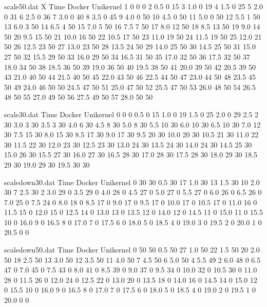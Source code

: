 \begin{filecontents}{scale50.dat}
    X   Time Docker Unikernel
    1   0   0   0
    2 0.5 0 15
    3 1.0 0 19
    4 1.5 0 25
    5 2.0 0 31
    6 2.5 0 36
    7 3.0 0 40
    8 3.5 0 45
    9 4.0 0 50
    10 4.5 0 50
    11 5.0 0 50
    12 5.5 1 50
    13 6.0 3 50
    14 6.5 4 50
    15 7.0 5 50
    16 7.5 7 50
    17 8.0 12 50
    18 8.5 13 50
    19 9.0 14 50
    20 9.5 15 50
    21 10.0 16 50
    22 10.5 17 50
    23 11.0 19 50
    24 11.5 19 50
    25 12.0 21 50
    26 12.5 23 50
    27 13.0 23 50
    28 13.5 24 50
    29 14.0 25 50
    30 14.5 25 50
    31 15.0 27 50
    32 15.5 29 50
    33 16.0 29 50
    34 16.5 31 50
    35 17.0 32 50
    36 17.5 32 50
    37 18.0 34 50
    38 18.5 36 50
    39 19.0 36 50
    40 19.5 38 50
    41 20.0 39 50
    42 20.5 39 50
    43 21.0 40 50
    44 21.5 40 50
    45 22.0 43 50
    46 22.5 44 50
    47 23.0 44 50
    48 23.5 45 50
    49 24.0 46 50
    50 24.5 47 50
    51 25.0 47 50
    52 25.5 47 50
    53 26.0 48 50
    54 26.5 48 50
    55 27.0 49 50
    56 27.5 49 50
    57 28.0 50 50

\end{filecontents}

\begin{filecontents}{scale30.dat}
    Time	Docker	Unikernel
    0	0	0
    0.5	0	15
    1.0	0	19
    1.5	0	25
    2.0	0	29
    2.5	2	30
    3.0	3	30
    3.5	3	30
    4.0	6	30
    4.5	8	30
    5.0	8	30
    5.5	10	30
    6.0	10	30
    6.5	10	30
    7.0	12	30
    7.5	15	30
    8.0	15	30
    8.5	17	30
    9.0	17	30
    9.5	20	30
    10.0	20	30
    10.5	21	30
    11.0	22	30
    11.5	22	30
    12.0	23	30
    12.5	23	30
    13.0	24	30
    13.5	24	30
    14.0	24	30
    14.5	25	30
    15.0	26	30
    15.5	27	30
    16.0	27	30
    16.5	28	30
    17.0	28	30
    17.5	28	30
    18.0	29	30
    18.5	29	30
    19.0	29	30
    19.5	30	30

\end{filecontents}


\begin{filecontents}{scaledown30.dat}
    Time	Docker	Unikernel
    0	30	30
    0.5	30	17
    1.0	30	13
    1.5	30	10
    2.0	30	7
    2.5	30	2
    3.0	29	0
    3.5	29	0
    4.0	28	0
    4.5	27	0
    5.0	27	0
    5.5	27	0
    6.0	26	0
    6.5	26	0
    7.0	25	0
    7.5	24	0
    8.0	18	0
    8.5	17	0
    9.0	17	0
    9.5	17	0
    10.0	17	0
    10.5	17	0
    11.0	16	0
    11.5	15	0
    12.0	15	0
    12.5	14	0
    13.0	13	0
    13.5	12	0
    14.0	12	0
    14.5	11	0
    15.0	11	0
    15.5	10	0
    16.0	9	0
    16.5	8	0
    17.0	7	0
    17.5	6	0
    18.0	5	0
    18.5	4	0
    19.0	3	0
    19.5	2	0
    20.0	1	0
    20.5	0	0

\end{filecontents}

\begin{filecontents}{scaledown50.dat}
    Time	Docker	Unikernel
0	50	50
0.5	50	27
1.0	50	22
1.5	50	20
2.0	50	18
2.5	50	13
3.0	50	12
3.5	50	11
4.0	50	7
4.5	50	6
5.0	50	4
5.5	49	2
6.0	48	0
6.5	47	0
7.0	45	0
7.5	43	0
8.0	41	0
8.5	39	0
9.0	37	0
9.5	34	0
10.0	32	0
10.5	30	0
11.0	28	0
11.5	26	0
12.0	24	0
12.5	22	0
13.0	20	0
13.5	18	0
14.0	16	0
14.5	14	0
15.0	12	0
15.5	10	0
16.0	9	0
16.5	8	0
17.0	7	0
17.5	6	0
18.0	5	0
18.5	4	0
19.0	2	0
19.5	1	0
20.0	0	0
\end{filecontents}